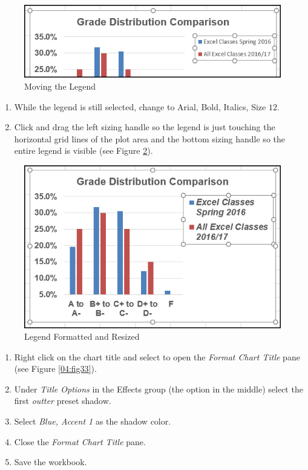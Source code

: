\begin{figure}[H]
	\centering
	\includegraphics[width=\maxwidth{.95\linewidth}]{gfx/ch04_fig31}
	\caption{Moving the Legend}
	\label{04:fig31}
\end{figure}

\begin{enumerate}
	\item While the legend is still selected, change  to Arial, Bold, Italics, Size $ 12 $.
	\item Click and drag the left sizing handle so the legend is just touching the horizontal grid lines of the plot area and the bottom sizing handle so the entire legend is visible (see Figure \ref{04:fig32}).
\end{enumerate}

\begin{figure}[H]
	\centering
	\includegraphics[width=\maxwidth{.95\linewidth}]{gfx/ch04_fig32}
	\caption{Legend Formatted and Resized}
	\label{04:fig32}
\end{figure}

\begin{enumerate}
	\item Right click on the chart title and select  to open the \textit{Format Chart Title} pane (see Figure \ref{04:fig33}).
	\item Under \textit{Title Options} in the Effects group (the option in the middle) select the first \textit{outter} preset shadow. 
	\item Select \textit{Blue, Accent 1} as the shadow color.
	\item Close the \textit{Format Chart Title} pane.
	\item Save the  workbook.
\end{enumerate}

